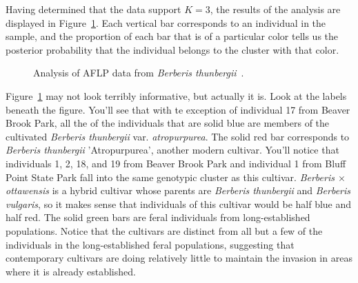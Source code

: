 Having determined that the data support $K=3$, the results of the
analysis are displayed in Figure~\ref{fig:lubell-structure}. Each
vertical bar corresponds to an individual in the sample, and the
proportion of each bar that is of a particular color tells us the
posterior probability that the individual belongs to the cluster with
that color.

\begin{figure}
\caption{Analysis of AFLP data from {\it Berberis
    thunbergii}~\cite{Lubell-etal-2008}.}\label{fig:lubell-structure} 
\end{figure}

Figure~\ref{fig:lubell-structure} may not look terribly informative,
but actually it is. Look at the labels beneath the figure. You'll see
that with te exception of individual 17 from Beaver Brook Park, all
the of the individuals that are solid blue are members of the
cultivated {\it Berberis thunbergii\/} var. {\it atropurpurea}. The
solid red bar corresponds to {\it Berberis thunbergii\/}
'Atropurpurea', another modern cultivar. You'll notice that
individuals 1, 2, 18, and 19 from Beaver Brook Park and individual 1
from Bluff Point State Park fall into the same genotypic cluster as
this cultivar. {\it Berberis $\times$ottawensis} is a hybrid cultivar
whose parents are {\it Berberis thunbergii\/} and {\it Berberis
  vulgaris\/}, so it makes sense that individuals of this cultivar
would be half blue and half red. The solid green bars are feral
individuals from long-established populations. Notice that the
cultivars are distinct from all but a few of the individuals in the
long-established feral populations, suggesting that contemporary
cultivars are doing relatively little to maintain the invasion in
areas where it is already established.

